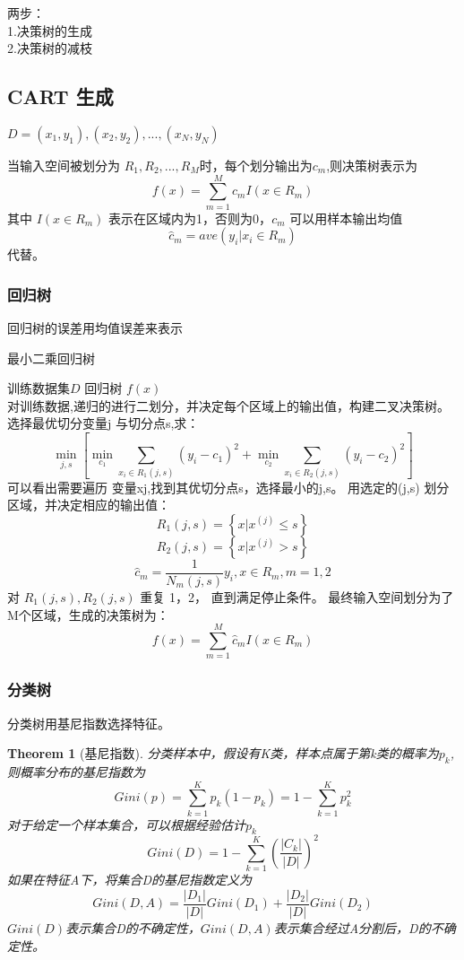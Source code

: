 \documentclass[UTF8]{ctexart}
\newtheorem{thm}{\bf Theorem}[section]
\begin{document}
两步：\\
1.决策树的生成\\
2.决策树的减枝\\

\subsection{CART 生成}
$D = {(x_1,y_1),(x_2,y_2),...,(x_N,y_N)}$ 

当输入空间被划分为 $R_1,R_2,...,R_M$时，每个划分输出为$c_m$,则决策树表示为
$$
f(x) = \sum_{m=1}^{M} c_m I(x \in R_m) 
$$
其中 $I(x \in R_m)$ 表示在区域内为1，否则为0，$c_m$ 可以用样本输出均值
$$
\hat{c}_m = ave(y_i|x_i \in R_m)
$$ 
代替。

\subsubsection{回归树}
回归树的误差用均值误差来表示
\begin{algorithm}[htb]
	\begin{algorithmic}[1]
		\caption{最小二乘回归树}
		\REQUIRE 训练数据集$D$
		\ENSURE 回归树 $f(x)$\\
		对训练数据,递归的进行二划分，并决定每个区域上的输出值，构建二叉决策树。
		\STATE 
		选择最优切分变量j 与切分点s,求：
		$$
		\min_{j,s} \left[  \min_{c_1} \sum_{x_i \in R_1(j,s)} (y_i - c_1)^2 + \min_{c_2} \sum_{x_i \in R_2(j,s)} (y_i - c_2)^2 \right] 
		$$
		可以看出需要遍历 变量xj,找到其优切分点s，选择最小的j,s。		
		\STATE 
		用选定的(j,s) 划分区域，并决定相应的输出值：
		$$
		R_1(j,s) = \left\lbrace x|x^{(j)} \le s \right\rbrace
		$$
		$$
		R_2(j,s) = \left\lbrace x|x^{(j)} > s \right\rbrace 
		$$
		$$
		\hat{c}_m = \frac{1}{N_m(j,s)} y_i, x \in R_m, m=1,2 
		$$
		\STATE 
		对 $R_1(j,s),R_2(j,s)$ 重复 1，2， 直到满足停止条件。
		\STATE 
		最终输入空间划分为了M个区域，生成的决策树为：
		$$
		f(x) = \sum_{m=1}^{M} \hat{c}_m I(x \in R_m) 
		$$
	\end{algorithmic}
\end{algorithm}



\subsubsection{分类树}
分类树用基尼指数选择特征。
\begin{thm}[基尼指数]
	分类样本中，假设有K类，样本点属于第k类的概率为$p_k$, 则概率分布的基尼指数为
	$$
	Gini(p) = \sum_{k=1}^{K} p_k(1-p_k) = 1 - \sum_{k=1}^{K} p_k^2
	$$
	对于给定一个样本集合，可以根据经验估计$p_k$
	$$
		Gini(D) = 1- \sum_{k=1}^{K} \left( \frac{|C_k|}{|D|} \right)^2 
	$$
	如果在特征A下，将集合D的基尼指数定义为
	$$
	Gini(D,A) = \frac{|D_1|}{|D|} Gini(D_1) + \frac{|D_2|}{|D|} Gini(D_2)  
	$$
	$Gini(D)$表示集合D的不确定性，$Gini(D,A)$表示集合经过A分割后，D的不确定性。
\end{thm}
\end{document}
